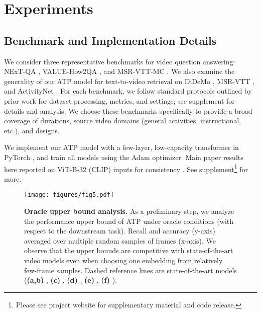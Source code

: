 
\section{Experiments}
\label{sec:experiments}

\subsection{Benchmark and Implementation Details}
\label{sec:exp:bench-implem}

 We consider three representative benchmarks for video question answering: NExT-QA \cite{xiao2021next}, VALUE-How2QA \cite{li2021value,li2020hero}, and MSR-VTT-MC \cite{xu2016msr}. We also examine the generality of our ATP model for text-to-video retrieval on DiDeMo \cite{hendricks2018localizing}, MSR-VTT \cite{xu2016msr}, and ActivityNet \cite{krishna2017dense}. For each benchmark, we follow standard protocols outlined by prior work \cite{lei2021less,xu2021videoclip,xiao2021next,li2021value} for dataset processing, metrics, and settings; see supplement for details and analysis. We choose these benchmarks specifically to provide a broad coverage of durations, source video domains (general activities, instructional, etc.), and designs. 

 We implement our ATP model with a few-layer, low-capacity transformer \cite{vaswani2017attention} in PyTorch \cite{paszke2019pytorch}, and train all models using the Adam \cite{kingma2014adam} optimizer. Main paper results here reported on ViT-B-32 (CLIP) inputs for consistency \cite{radford2018improving,dosovitskiy2020image,li2021value}.
See supplement\footnote{Please see project website for supplementary material and code release.}
for more.

\begin{figure}[t]
\begin{center}
\centerline{\texttt{[image: figures/fig5.pdf]}}
\vskip -0.1in
\caption{\textbf{Oracle upper bound analysis.} As a preliminary step, we analyze the performance upper bound of ATP under oracle conditions (with respect to the downstream task). Recall and accuracy (y-axis) averaged over multiple random samples of  frames (x-axis). We observe that the upper bounds are competitive with state-of-the-art video models even when choosing one embedding from relatively few-frame samples. Dashed reference lines are state-of-the-art models (\textbf{(a,b)} \cite{xu2021videoclip}, \textbf{(c)} \cite{li2021value}, \textbf{(d)} \cite{bain2021frozen}, \textbf{(e)} \cite{xiao2021next}, \textbf{(f)} \cite{lei2021less}).
}
\label{fig:exp-oracle-analysis}
\end{center}
\vskip -0.2in
\end{figure}

